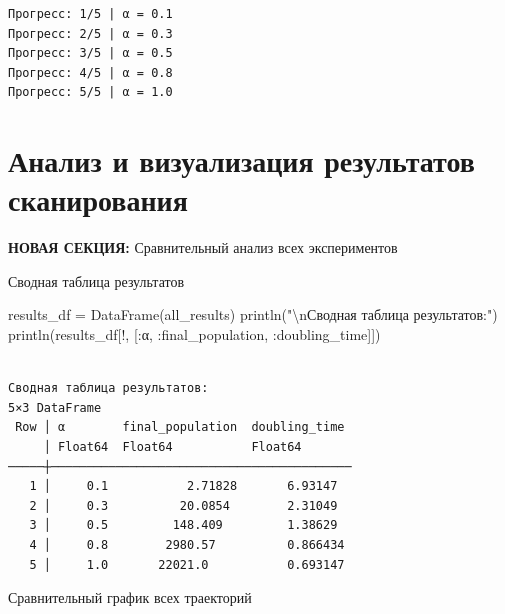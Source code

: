 \documentclass[
  12pt,
  a4paper,
  DIV=11,
  numbers=noendperiod]{scrreprt}
\newenvironment{Shaded}{\begin{snugshade}}{\end{snugshade}}
\newcommand{\FunctionTok}[1]{\textcolor[rgb]{0.28,0.35,0.67}{#1}}
\newcommand{\NormalTok}[1]{\textcolor[rgb]{0.00,0.23,0.31}{#1}}
\newcommand{\OperatorTok}[1]{\textcolor[rgb]{0.37,0.37,0.37}{#1}}
\newcommand{\SpecialCharTok}[1]{\textcolor[rgb]{0.37,0.37,0.37}{#1}}
\newcommand{\StringTok}[1]{\textcolor[rgb]{0.13,0.47,0.30}{#1}}
\begin{document}
\begin{verbatim}
Прогресс: 1/5 | α = 0.1
Прогресс: 2/5 | α = 0.3
Прогресс: 3/5 | α = 0.5
Прогресс: 4/5 | α = 0.8
Прогресс: 5/5 | α = 1.0
\end{verbatim}

\section{Анализ и визуализация результатов
сканирования}\label{ux430ux43dux430ux43bux438ux437-ux438-ux432ux438ux437ux443ux430ux43bux438ux437ux430ux446ux438ux44f-ux440ux435ux437ux443ux43bux44cux442ux430ux442ux43eux432-ux441ux43aux430ux43dux438ux440ux43eux432ux430ux43dux438ux44f}

\textbf{НОВАЯ СЕКЦИЯ:} Сравнительный анализ всех экспериментов

Сводная таблица результатов

\begin{Shaded}
\begin{Highlighting}[]
\NormalTok{results\_df }\OperatorTok{=} \FunctionTok{DataFrame}\NormalTok{(all\_results)}
\FunctionTok{println}\NormalTok{(}\StringTok{"}\SpecialCharTok{\textbackslash{}n}\StringTok{Сводная таблица результатов:"}\NormalTok{)}
\FunctionTok{println}\NormalTok{(results\_df[!, [}\OperatorTok{:}\NormalTok{α, }\OperatorTok{:}\NormalTok{final\_population, }\OperatorTok{:}\NormalTok{doubling\_time]])}
\end{Highlighting}
\end{Shaded}

\begin{verbatim}

Сводная таблица результатов:
5×3 DataFrame
 Row │ α        final_population  doubling_time 
     │ Float64  Float64           Float64       
─────┼──────────────────────────────────────────
   1 │     0.1           2.71828       6.93147
   2 │     0.3          20.0854        2.31049
   3 │     0.5         148.409         1.38629
   4 │     0.8        2980.57          0.866434
   5 │     1.0       22021.0           0.693147
\end{verbatim}

Сравнительный график всех траекторий
\end{document}
